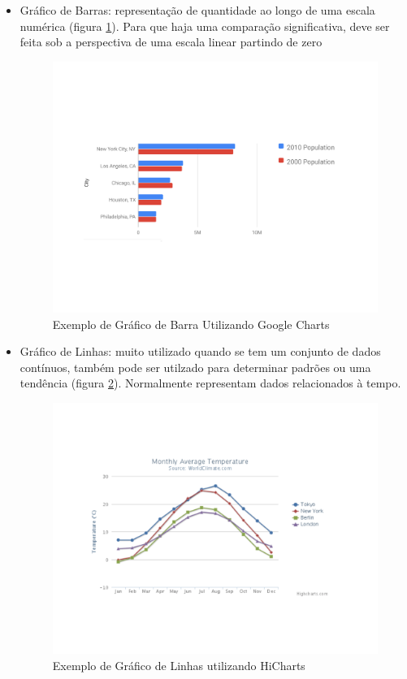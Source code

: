 \begin{itemize}

\item Gráfico de Barras: representação de quantidade ao longo de uma escala numérica (figura \ref{img:bar_graph}). Para que haja uma comparação significativa, deve ser feita sob a perspectiva de uma escala linear partindo de zero\cite{doumont_choosing_2002}
\graphicspath{{figuras/}}
\begin{figure}[h]
\centering
\includegraphics[scale=0.40]{chart_bar}
\caption{Exemplo de Gráfico de Barra Utilizando Google Charts}
\label{img:bar_graph}
\end{figure}

\item Gráfico de Linhas: muito utilizado quando se tem um conjunto de dados contínuos, também pode ser utilzado para determinar padrões ou uma tendência (figura \ref{img:line_graph}). Normalmente representam dados relacionados à tempo.
\graphicspath{{figuras/}}
\begin{figure}[h]
\centering
\includegraphics[scale=0.40]{line_chart}
\caption{Exemplo de Gráfico de Linhas utilizando HiCharts}
\label{img:line_graph}
\end{figure}


\end{itemize}
